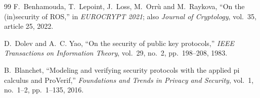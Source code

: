 \begin{thebibliography}{99}
 F.~Benhamouda, T.~Lepoint, J.~Loss, M.~Orr\`u and M.~Raykova, ``On the (in)security of ROS,'' in \emph{EUROCRYPT 2021}; also
\emph{Journal of Cryptology}, vol.~35, article 25, 2022.

 D.~Dolev and A.~C. Yao, ``On the security of public key protocols,'' \emph{IEEE Transactions on Information Theory}, vol.~29,
no.~2, pp.~198--208, 1983.

 B.~Blanchet, ``Modeling and verifying security protocols with the applied pi calculus and ProVerif,'' \emph{Foundations and
Trends in Privacy and Security}, vol.~1, no.~1--2, pp.~1--135, 2016.

\end{thebibliography}
